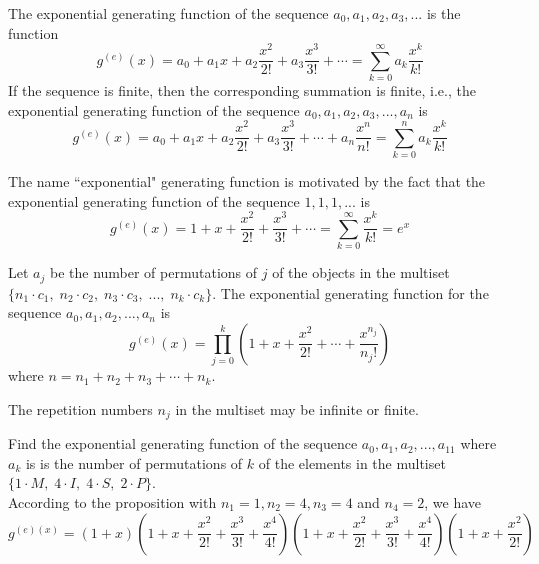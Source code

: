 \documentclass[handout]{ximera}
\begin{document}
\begin{definition}
The exponential generating function of the sequence $a_0, a_1, a_2, a_3, ...$ is the function
\[
g^{(e)}(x) = a_0 + a_1x + a_2\frac{x^2}{2!} + a_3\frac{x^3}{3!} + \cdots = \sum_{k=0}^\infty a_k \frac{x^k}{k!}
\]
If the sequence is finite, then the corresponding summation is finite, i.e., the exponential generating function of the sequence
$a_0, a_1, a_2, a_3, ..., a_n$ is
\[
g^{(e)}(x) = a_0 + a_1x + a_2\frac{x^2}{2!} + a_3\frac{x^3}{3!} + \cdots  + a_n\frac{x^n}{n!} = \sum_{k=0}^n a_k \frac{x^k}{k!}
\]
\end{definition}

\begin{remark} The name ``exponential" generating function is motivated by the fact that the exponential 
generating function of the sequence $1, 1, 1, ...$ is
\[
g^{(e)}(x) = 1 + x + \frac{x^2}{2!} + \frac{x^3}{3!} + \cdots = \sum_{k=0}^\infty \frac{x^k}{k!} = e^x
\]
\end{remark}

\begin{proposition}
Let $a_j$ be the number of permutations of $j$ of the objects in the 
multiset $\{n_1 \cdot c_1,\; n_2 \cdot c_2,\; n_3 \cdot c_3, \;...,\; n_k \cdot c_k\}$.
The exponential generating function for the sequence $a_0, a_1, a_2, ..., a_n$ 
is 
\[
g^{(e)}(x) = \prod_{j=0}^k \left(1 + x + \frac{x^2}{2!} + \cdots + \frac{x^{n_j}}{n_j !}\right)
\]
where $n = n_1 + n_2 + n_3 + \cdots + n_k$.
\end{proposition}
\begin{remark}
The repetition numbers $n_j$ in the multiset may be infinite or finite.
\end{remark}

\begin{example}[example 1] 
Find the exponential generating function of the sequence $a_0, a_1, a_2, ..., a_{11}$ where $a_k$ is is the number of 
permutations of $k$ of the elements in the multiset $\{1\cdot M,\; 4\cdot I,\; 4\cdot S,\; 2\cdot P\}$.\\
According to the proposition with $n_1 = 1, n_2 = 4, n_3 = 4$ and $n_4 = 2$, we have
\[
g^{(e)(x)} = \left(1+x\right)\left(1+x+\frac{x^2}{2!} + \frac{x^3}{3!} + \frac{x^4}{4!}\right)
\left(1+x+\frac{x^2}{2!} + \frac{x^3}{3!} + \frac{x^4}{4!}\right)
\left(1+x+\frac{x^2}{2!}\right)
\]
\end{example}
\end{document}
